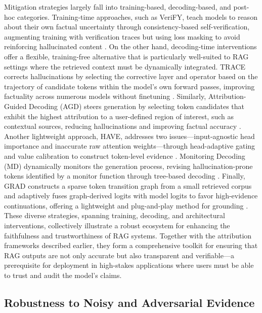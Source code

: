 \documentclass[11pt]{article}
\begin{document}
Mitigation strategies largely fall into training-based, decoding-based, and post-hoc categories. Training-time approaches, such as VeriFY, teach models to reason about their own factual uncertainty through consistency-based self-verification, augmenting training with verification traces but using loss masking to avoid reinforcing hallucinated content \cite{ref203}. On the other hand, decoding-time interventions offer a flexible, training-free alternative that is particularly well-suited to RAG settings where the retrieved context must be dynamically integrated. TRACE corrects hallucinations by selecting the corrective layer and operator based on the trajectory of candidate tokens within the model's own forward passes, improving factuality across numerous models without finetuning \cite{ref204}. Similarly, Attribution-Guided Decoding (AGD) steers generation by selecting token candidates that exhibit the highest attribution to a user-defined region of interest, such as contextual sources, reducing hallucinations and improving factual accuracy \cite{ref205}. Another lightweight approach, HAVE, addresses two issues---input-agnostic head importance and inaccurate raw attention weights---through head-adaptive gating and value calibration to construct token-level evidence \cite{ref206}. Monitoring Decoding (MD) dynamically monitors the generation process, revising hallucination-prone tokens identified by a monitor function through tree-based decoding \cite{ref207}. Finally, GRAD constructs a sparse token transition graph from a small retrieved corpus and adaptively fuses graph-derived logits with model logits to favor high-evidence continuations, offering a lightweight and plug-and-play method for grounding \cite{ref208}. These diverse strategies, spanning training, decoding, and architectural interventions, collectively illustrate a robust ecosystem for enhancing the faithfulness and trustworthiness of RAG systems. Together with the attribution frameworks described earlier, they form a comprehensive toolkit for ensuring that RAG outputs are not only accurate but also transparent and verifiable---a prerequisite for deployment in high-stakes applications where users must be able to trust and audit the model's claims.

\subsection{Robustness to Noisy and Adversarial Evidence}
\end{document}
